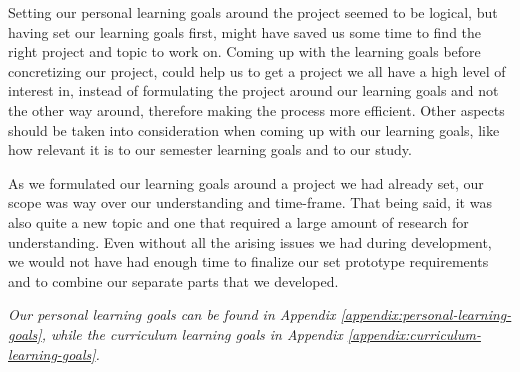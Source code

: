 Setting our personal learning goals around the project seemed to be logical, but having set our learning goals first, might have saved us some time to find the right project and topic to work on. Coming up with the learning goals before concretizing our project, could help us to get a project we all have a high level of interest in, instead of formulating the project around our learning goals and not the other way around, therefore making the process more efficient. Other aspects should be taken into consideration when coming up with our learning goals, like how relevant it is to our semester learning goals and to our study.

As we formulated our learning goals around a project we had already set, our scope was way over our understanding and time-frame. That being said, it was also quite a new topic and one that required a large amount of research for understanding. Even without all the arising issues we had during development, we would not have had enough time to finalize our set prototype requirements and to combine our separate parts that we developed.

\textit{Our personal learning goals can be found in Appendix \ref{appendix:personal-learning-goals}, while the curriculum learning goals in Appendix \ref{appendix:curriculum-learning-goals}.}